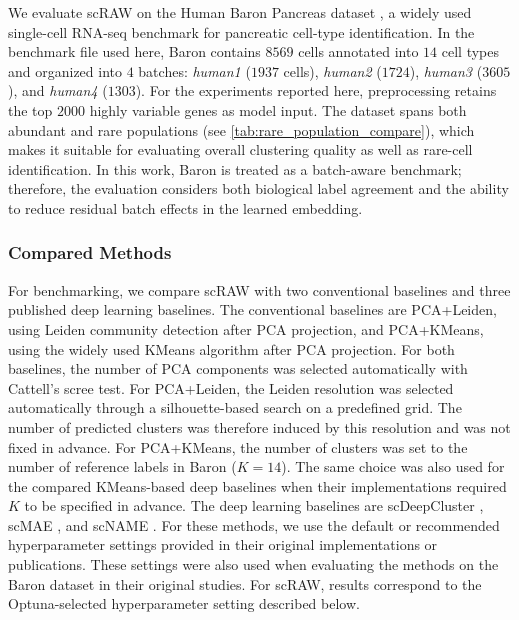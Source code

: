 \documentclass[11pt,a4paper]{article}
\begin{document}
We evaluate scRAW on the Human Baron Pancreas dataset \cite{baron2016}, a widely used single-cell RNA-seq benchmark for pancreatic cell-type identification. In the benchmark file used here, Baron contains $8569$ cells annotated into $14$ cell types and organized into $4$ batches: \textit{human1} ($1937$ cells), \textit{human2} ($1724$), \textit{human3} ($3605$), and \textit{human4} ($1303$). For the experiments reported here, preprocessing retains the top $2000$ highly variable genes as model input. The dataset spans both abundant and rare populations (see \autoref{tab:rare_population_compare}), which makes it suitable for evaluating overall clustering quality as well as rare-cell identification. In this work, Baron is treated as a batch-aware benchmark; therefore, the evaluation considers both biological label agreement and the ability to reduce residual batch effects in the learned embedding.

\subsubsection*{Compared Methods}

For benchmarking, we compare scRAW with two conventional baselines and
three published deep learning baselines. The conventional baselines are
PCA+Leiden, using Leiden community detection \cite{traag2019} after PCA
projection, and PCA+KMeans, using the widely used KMeans algorithm
\cite{macqueen1967} after PCA projection. For both baselines, the number
of PCA components was selected automatically with Cattell's scree test.
For PCA+Leiden, the Leiden resolution was selected automatically through
a silhouette-based search on a predefined
grid. The number of predicted clusters was therefore induced by this
resolution and was not fixed in advance. For PCA+KMeans, the number of
clusters was set to the number of reference labels in Baron
($K = 14$). The same choice was also used for the compared KMeans-based
deep baselines when their implementations required $K$ to be specified
in advance.
The deep learning baselines
are scDeepCluster \cite{tian2019}, scMAE \cite{fang2024}, and scNAME
\cite{wan2022}.
For these methods, we use the default or recommended hyperparameter settings provided in their original implementations or publications. These settings were also used when evaluating the methods on the Baron dataset in their original studies. For scRAW, results correspond to the Optuna-selected hyperparameter setting described below.
\end{document}
